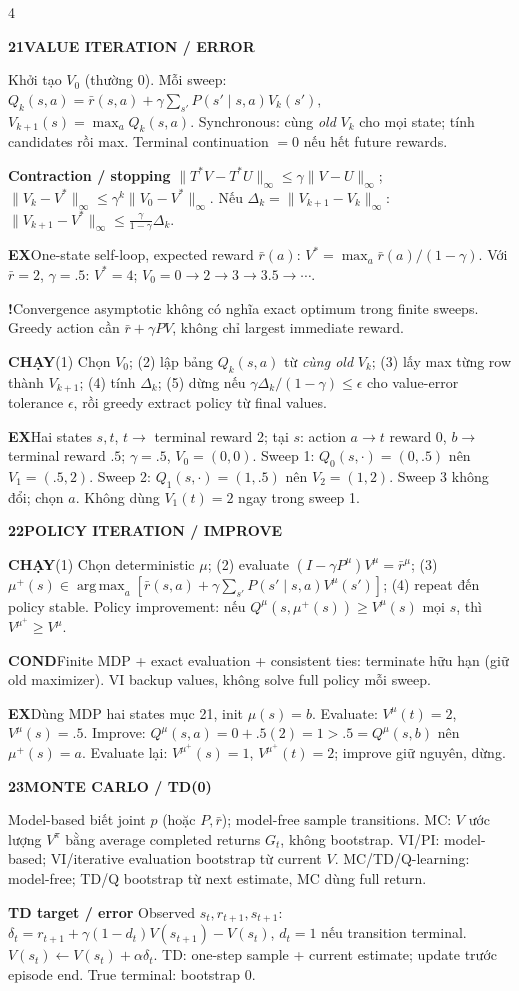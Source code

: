 \documentclass[a4paper]{article}
\newcommand{\topic}[2]{\par\addvspace{.8pt}%
  \begingroup\setlength{\fboxsep}{0.5pt}%
  \noindent\colorbox{structure}{\parbox{\dimexpr\linewidth-2\fboxsep\relax}{%
    \color{white}\fontsize{6.5}{7.1}\selectfont\bfseries #1\enspace #2}}%
  \endgroup\par\nobreak\vspace{.3pt}\nobreak}
\newcommand{\run}[1]{\key{CHẠY}#1}
\newcommand{\key}[1]{\par\textcolor{structure}{\textbf{#1}}\enspace}
\newcommand{\note}[4]{\par\begingroup\setlength{\fboxsep}{0.15pt}%
  \noindent\colorbox{#1}{\parbox{\dimexpr\linewidth-2\fboxsep\relax}{%
    \RaggedRight\textcolor{#2}{\textbf{#3}}\enspace #4}}%
  \endgroup\par}
\newcommand{\cond}[1]{\note{conditionbg}{condition}{COND}{#1}}
\newcommand{\trap}[1]{\note{warningbg}{warning}{!}{#1}}
\newcommand{\ex}[1]{\note{examplebg}{example}{EX}{#1}}
\newcommand{\norm}[1]{\lVert#1\rVert}
\newcommand{\argmax}{\operatorname*{arg\,max}}
\begin{document}
\begin{multicols*}{4}
\topic{21}{VALUE ITERATION / ERROR}
Khởi tạo $V_0$ (thường $0$). Mỗi sweep:
$Q_k(s,a)=\bar r(s,a)+\gamma\sum_{s'}P(s'\mid s,a)V_k(s'),$ $ V_{k+1}(s)=\max_a Q_k(s,a).$
Synchronous: cùng \emph{old} $V_k$ cho mọi state; tính candidates rồi max. Terminal continuation $=0$ nếu hết future rewards.
\key{Contraction / stopping}
$\norm{T^*V-T^*U}_\infty\le\gamma\norm{V-U}_\infty$;
$\norm{V_k-V^*}_\infty\le\gamma^k\norm{V_0-V^*}_\infty$.
Nếu $\Delta_k=\norm{V_{k+1}-V_k}_\infty$:
$\norm{V_{k+1}-V^*}_\infty\le\frac\gamma{1-\gamma}\Delta_k.$
\ex{One-state self-loop, expected reward $\bar r(a)$: $V^*=\max_a\bar r(a)/(1-\gamma)$. Với $\bar r=2$, $\gamma=.5$: $V^*=4$; $V_0=0\to2\to3\to3.5\to\cdots$.}
\trap{Convergence asymptotic không có nghĩa exact optimum trong finite sweeps. Greedy action cần $\bar r+\gamma PV$, không chỉ largest immediate reward.}
\run{(1) Chọn $V_0$; (2) lập bảng $Q_k(s,a)$ từ \emph{cùng old} $V_k$; (3) lấy max từng row thành $V_{k+1}$; (4) tính $\Delta_k$; (5) dừng nếu $\gamma\Delta_k/(1-\gamma)\le\epsilon$ cho value-error tolerance $\epsilon$, rồi greedy extract policy từ final values.}
\ex{Hai states $s,t$, $t\to$ terminal reward 2; tại $s$: action $a\to t$ reward 0, $b\to$ terminal reward $.5$; $\gamma=.5$, $V_0=(0,0)$. Sweep 1: $Q_0(s,\cdot)=(0,.5)$ nên $V_1=(.5,2)$. Sweep 2: $Q_1(s,\cdot)=(1,.5)$ nên $V_2=(1,2)$. Sweep 3 không đổi; chọn $a$. Không dùng $V_1(t)=2$ ngay trong sweep 1.}

\topic{22}{POLICY ITERATION / IMPROVE}
\run{(1) Chọn deterministic $\mu$;
(2) evaluate $(I-\gamma P^\mu)V^\mu=\bar r^\mu$;
(3) $\mu^+(s)\in\argmax_a[\bar r(s,a)+\gamma\sum_{s'}P(s'\mid s,a)V^\mu(s')]$;
(4) repeat đến policy stable.}
Policy improvement: nếu $Q^\mu(s,\mu^+(s))\ge V^\mu(s)$ mọi $s$, thì $V^{\mu^+}\ge V^\mu$.
\cond{Finite MDP + exact evaluation + consistent ties: terminate hữu hạn (giữ old maximizer). VI backup values, không solve full policy mỗi sweep.}
\ex{Dùng MDP hai states mục 21, init $\mu(s)=b$. Evaluate: $V^\mu(t)=2$, $V^\mu(s)=.5$. Improve: $Q^\mu(s,a)=0+.5(2)=1>.5=Q^\mu(s,b)$ nên $\mu^+(s)=a$. Evaluate lại: $V^{\mu^+}(s)=1$, $V^{\mu^+}(t)=2$; improve giữ nguyên, dừng.}

\topic{23}{MONTE CARLO / TD(0)}
Model-based biết joint $p$ (hoặc $P,\bar r$); model-free sample transitions. MC: $V$ ước lượng $V^\pi$ bằng average completed returns $G_t$, không bootstrap.
VI/PI: model-based; VI/iterative evaluation bootstrap từ current $V$. MC/TD/Q-learning: model-free; TD/Q bootstrap từ next estimate, MC dùng full return.
\key{TD target / error}
Observed $s_t,r_{t+1},s_{t+1}$:
$\delta_t=r_{t+1}+\gamma(1-d_t)V(s_{t+1})-V(s_t)$, $d_t=1$ nếu transition terminal.
$V(s_t)\gets V(s_t)+\alpha\delta_t.$
TD: one-step sample + current estimate; update trước episode end. True terminal: bootstrap $0$.


\end{multicols*}
\end{document}
